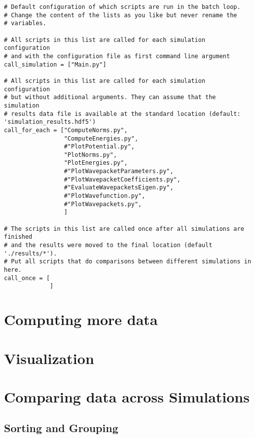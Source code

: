 \documentclass[a4paper,10pt]{report}
\begin{document}
\begin{lstlisting}[float=tp,frame=single,label=lstdefbatch02,caption={Default batch configuration \texttt{batchconfiguration.py}}]
# Default configuration of which scripts are run in the batch loop.
# Change the content of the lists as you like but never rename the
# variables.

# All scripts in this list are called for each simulation configuration
# and with the configuration file as first command line argument
call_simulation = ["Main.py"]

# All scripts in this list are called for each simulation configuration
# but without additional arguments. They can assume that the simulation
# results data file is available at the standard location (default: 'simulation_results.hdf5')
call_for_each = ["ComputeNorms.py",
                 "ComputeEnergies.py",
                 #"PlotPotential.py",
                 "PlotNorms.py",
                 "PlotEnergies.py",
                 #"PlotWavepacketParameters.py",
                 #"PlotWavepacketCoefficients.py",
                 #"EvaluateWavepacketsEigen.py",
                 #"PlotWavefunction.py",
                 #"PlotWavepackets.py",
                 ]

# The scripts in this list are called once after all simulations are finished
# and the results were moved to the final location (default './results/*').
# Put all scripts that do comparisons between different simulations in here.
call_once = [
             ]
\end{lstlisting}





\section{Computing more data}


\section{Visualization}


\section{Comparing data across Simulations}


\subsection{Sorting and Grouping}
\end{document}
